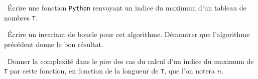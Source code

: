 \exer{}
\setcounter{numques}{0}

\question\ Écrire une fonction \texttt{Python}{} renvoyant un indice du maximum d'un tableau de nombres \texttt{T}.

\medskip

\question\ Écrire un invariant de boucle pour cet algorithme. Démontrer que l'algorithme précédent donne le bon résultat.

\medskip

\question\ Donner la complexité dans le pire des cas du calcul d'un indice du maximum de \texttt{T} par cette 
fonction, en fonction de la longueur de \texttt{T}, que l'on notera $n$. 